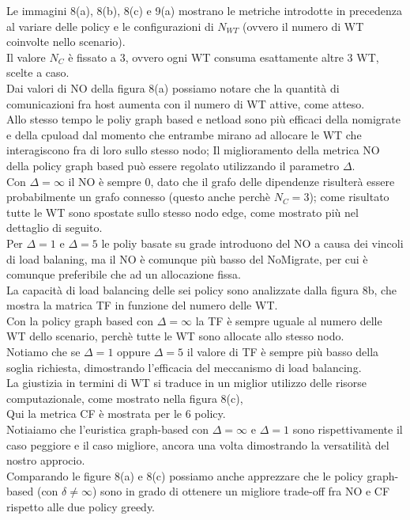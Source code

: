 \documentclass[11pt]{article}
\begin{document}
	Le immagini 8(a), 8(b), 8(c) e 9(a) mostrano le metriche introdotte in precedenza al variare delle policy e le configurazioni di $N_{WT}$ (ovvero il numero di WT coinvolte nello scenario).\\
	Il valore $N_C$ è fissato a 3, ovvero ogni WT consuma esattamente altre 3 WT, scelte a caso. \\
	Dai valori di NO della figura 8(a) possiamo notare che la quantità di comunicazioni fra host aumenta con il numero di WT attive, come atteso. \\
	Allo stesso tempo le poliy graph based e netload sono più efficaci della nomigrate e della cpuload dal momento che entrambe mirano ad allocare le WT che interagiscono fra di loro sullo stesso nodo;
	Il miglioramento della metrica NO della policy graph based può essere regolato utilizzando il parametro $\Delta$. \\
	Con $\Delta = \infty$ il NO è sempre 0, dato che il grafo delle dipendenze risulterà essere probabilmente un grafo connesso (questo anche perchè $N_C = 3$); come risultato tutte le WT sono spostate sullo stesso nodo edge, come mostrato più nel dettaglio di seguito. \\
	Per $\Delta  = 1$ e $\Delta = 5$ le poliy basate su grade introduono del NO a causa dei vincoli di load balaning, ma il NO è comunque più basso del NoMigrate, per cui è comunque preferibile che ad un allocazione fissa. \\
	La capacità di load balancing delle sei policy sono analizzate dalla figura 8b, che mostra la matrica TF in funzione del numero delle WT. \\
	Con la policy graph based con $\Delta = \infty$ la TF è sempre uguale al numero delle WT dello scenario, perchè tutte le WT sono allocate allo stesso nodo. \\
	Notiamo che se $\Delta = 1$ oppure $\Delta = 5$ il valore di TF è sempre più basso della soglia richiesta, dimostrando l'efficacia del meccanismo di load balancing. \\
	La giustizia in termini di WT si traduce in un miglior utilizzo delle risorse computazionale, come mostrato nella figura 8(c), \\
	Qui la metrica CF è mostrata per le 6 policy. \\
	Notiaiamo che l'euristica graph-based con $\Delta = \infty$ e $\Delta = 1$ sono rispettivamente il caso peggiore e il caso migliore, ancora una volta dimostrando la versatilità del nostro approcio. \\
	Comparando le figure 8(a) e 8(c) possiamo anche apprezzare che le policy graph-based (con $\delta \neq \infty$) sono in grado di ottenere un migliore trade-off fra NO e CF rispetto alle due policy greedy.
\end{document}
